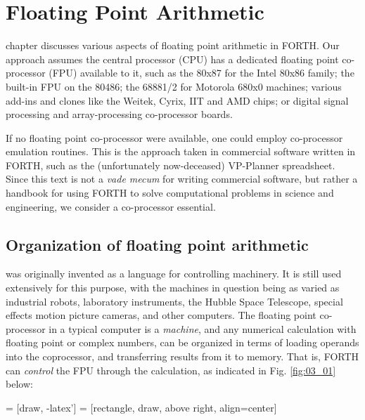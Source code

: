 
\chapter{Floating Point Arithmetic}

\addtocounter{equation}{1} %

\tableofcontents

 chapter discusses various aspects of floating point arithmetic in FORTH. Our approach assumes the central processor (CPU) has a dedicated floating point co-processor (FPU) available to it, such as the 80x87 for the Intel 80x86 family; the built-in FPU on the 80486; the 68881/2 for Motorola 680x0 machines; various add-ins and clones like the Weitek, Cyrix, IIT and AMD chips; or digital signal processing and array-processing co-processor boards.

If no floating point co-processor were available, one could employ co-processor emulation routines. This is the approach taken in commercial software written in FORTH, such as the (unfortunately now-deceased) VP-Planner spreadsheet. Since this text is not a \textit{vade mecum} for writing commercial software, but rather a handbook for using FORTH to solve computational problems in science and engineering, we consider a co-processor essential.

\section{Organization of floating point arithmetic}

 was originally invented as a language for controlling machinery. It is still used extensively for this purpose, with the machines in question being as varied as industrial robots, laboratory instruments, the Hubble Space Telescope, special effects motion picture cameras, and other computers. The floating point co-processor in a typical computer is a \textit{machine}, and any numerical calculation with floating point or complex numbers, \eg can be organized in terms of loading operands into the coprocessor, and transferring results from it to memory. That is, FORTH can \textit{control} the FPU through the calculation, as indicated in Fig. \ref{fig:03_01} below:

 = [draw, -latex']
 = [rectangle, draw, above right, align=center]

